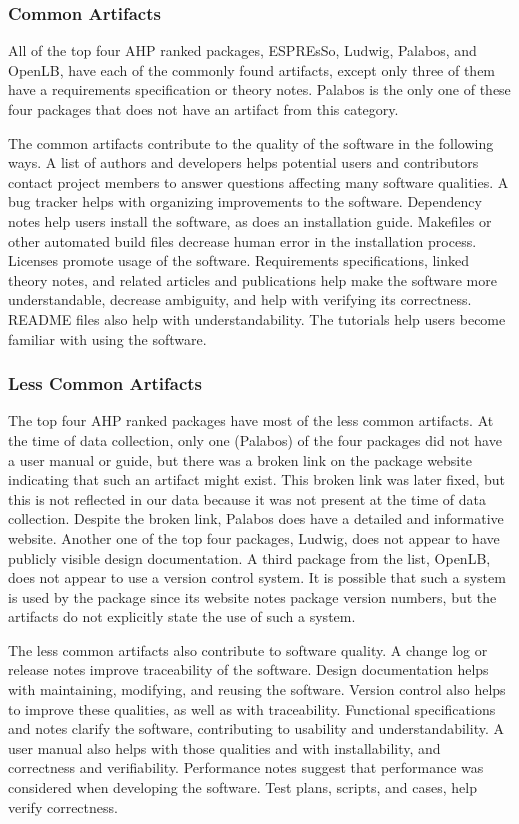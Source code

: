 \documentclass[final, 3p, times, authoryear]{elsarticle}
\begin{document}
\subsubsection{Common Artifacts}

All of the top four AHP ranked packages, ESPREsSo, Ludwig, Palabos, and OpenLB, have each of the commonly found artifacts, except only three of them have a
requirements specification or theory notes. Palabos is the only one of these
four packages that does not have an artifact from this category.

The common artifacts contribute to the quality of the software in the following
ways. A list of authors and developers helps potential users and contributors
contact project members to answer questions affecting many software qualities. A
bug tracker helps with organizing improvements to the software. Dependency notes
help users install the software, as does an installation guide. Makefiles or
other automated build files decrease human error in the installation process.
Licenses promote usage of the software. Requirements specifications, linked
theory notes, and related articles and publications help make the software more
understandable, decrease ambiguity, and help with verifying its correctness.
README files also help with understandability. The tutorials help users become
familiar with using the software.


\subsubsection{Less Common Artifacts} \label{lesscommon}

The top four AHP ranked packages have most of the less common artifacts. At the
time of data collection, only one (Palabos) of the four packages did not have a
user manual or guide, but there was a broken link on the package website
indicating that such an artifact might exist. This broken link was later fixed,
but this is not reflected in our data because it was not present at the time of
data collection. Despite the broken link, Palabos does have a detailed and
informative website. Another one of the top four packages, Ludwig, does not
appear to have publicly visible design documentation. A third package from the list, OpenLB, does not appear to use a version control system. It is possible
that such a system is used by the package since its website notes package
version numbers, but the artifacts do not explicitly state the use of such a
system.

The less common artifacts also contribute to software quality. A change log or
release notes improve traceability of the software. Design documentation helps
with maintaining, modifying, and reusing the software. Version control also
helps to improve these qualities, as well as with traceability. Functional
specifications and notes clarify the software, contributing to usability and
understandability. A user manual also helps with those qualities and with
installability, and correctness and verifiability. Performance notes suggest
that performance was considered when developing the software. Test plans,
scripts, and cases, help verify correctness. 
\end{document}
